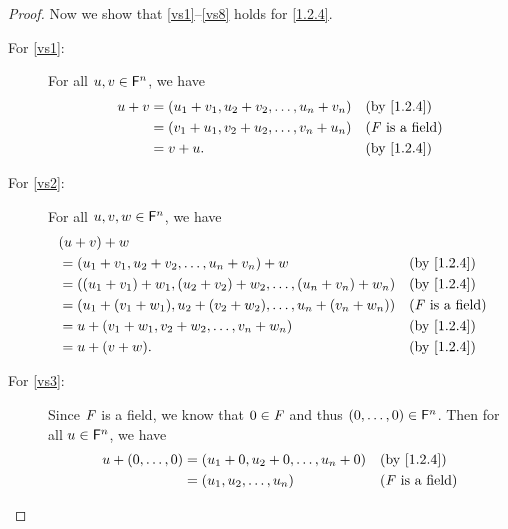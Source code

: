 \begin{proof}
  Now we show that \ref{vs1}--\ref{vs8} holds for \cref{1.2.4}.
  \begin{description}
    \item[For \ref{vs1}:]
      For all \(u, v \in \mathsf{F}^{n}\), we have
      \begin{align*}
        u + v & = \p{u_{1} + v_{1}, u_{2} + v_{2}, \dots, u_{n} + v_{n}} &  & \text{(by \cref{1.2.4})}   \\
              & = \p{v_{1} + u_{1}, v_{2} + u_{2}, \dots, v_{n} + u_{n}} &  & \text{(\(\F\) is a field)} \\
              & = v + u.                                                 &  & \text{(by \cref{1.2.4})}
      \end{align*}
    \item[For \ref{vs2}:]
      For all \(u, v, w \in \mathsf{F}^{n}\), we have
      \begin{align*}
         & \p{u + v} + w                                                                                                                \\
         & = \p{u_{1} + v_{1}, u_{2} + v_{2}, \dots, u_{n} + v_{n}} + w                                 &  & \text{(by \cref{1.2.4})}   \\
         & = \p{\p{u_{1} + v_{1}} + w_{1}, \p{u_{2} + v_{2}} + w_{2}, \dots, \p{u_{n} + v_{n}} + w_{n}} &  & \text{(by \cref{1.2.4})}   \\
         & = \p{u_{1} + \p{v_{1} + w_{1}}, u_{2} + \p{v_{2} + w_{2}}, \dots, u_{n} + \p{v_{n} + w_{n}}} &  & \text{(\(\F\) is a field)} \\
         & = u + \p{v_{1} + w_{1}, v_{2} + w_{2}, \dots, v_{n} + w_{n}}                                 &  & \text{(by \cref{1.2.4})}   \\
         & = u + \p{v + w}.                                                                             &  & \text{(by \cref{1.2.4})}
      \end{align*}
    \item[For \ref{vs3}:]
      Since \(\mathit{F}\) is a field, we know that \(0 \in \mathit{F}\) and thus \(\left\lparen0, \dots, 0\right\rparen \in \mathsf{F}^{n}\).
      Then for all \(u \in \mathsf{F}^{n}\), we have
      \begin{align*}
        u + \p{0, \dots, 0} & = \p{u_{1} + 0, u_{2} + 0, \dots, u_{n} + 0} &  & \text{(by \cref{1.2.4})}   \\
                            & = \tp{u}{n}                                  &  & \text{(\(\F\) is a field)} \\

\end{align*}
\end{description}
\end{proof}

